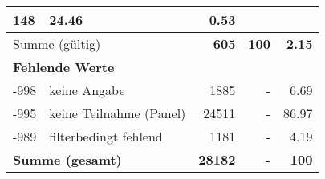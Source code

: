 \begin{longtable}{lXrrr}
       \num{148} &
       \num[round-mode=places,round-precision=2]{24.46} &
         \num[round-mode=places,round-precision=2]{0.53} \\
     \midrule
     \multicolumn{2}{l}{Summe (gültig)} &
       \textbf{\num{605}} &
     \textbf{\num{100}} &
       \textbf{\num[round-mode=places,round-precision=2]{2.15}} \\
     \multicolumn{5}{l}{\textbf{Fehlende Werte}}\\
       -998 &
       keine Angabe &
         \num{1885} &
        - &
         \num[round-mode=places,round-precision=2]{6.69} \\
       -995 &
       keine Teilnahme (Panel) &
         \num{24511} &
        - &
         \num[round-mode=places,round-precision=2]{86.97} \\
       -989 &
       filterbedingt fehlend &
         \num{1181} &
        - &
         \num[round-mode=places,round-precision=2]{4.19} \\
     \midrule
     \multicolumn{2}{l}{\textbf{Summe (gesamt)}} &
          \textbf{\num{28182}} &
        \textbf{-} &
        \textbf{\num{100}} \\
     \bottomrule
     \end{longtable}
     
